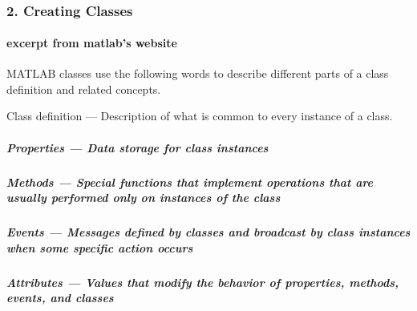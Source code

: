 \documentclass[11pt]{article}
\begin{document}
    \begin{center}
    \end{center}
    { \hspace*{\fill} \\}
    
    \hypertarget{creating-classes}{%
\subsubsection{2. Creating Classes}\label{creating-classes}}

    \hypertarget{excerpt-from-matlabs-website}{%
\paragraph{excerpt from matlab's
website}\label{excerpt-from-matlabs-website}}

MATLAB classes use the following words to describe different parts of a
class definition and related concepts.

Class definition --- Description of what is common to every instance of
a class.

\hypertarget{properties-data-storage-for-class-instances}{%
\subparagraph{Properties --- Data storage for class
instances}\label{properties-data-storage-for-class-instances}}

\hypertarget{methods-special-functions-that-implement-operations-that-are-usually-performed-only-on-instances-of-the-class}{%
\subparagraph{Methods --- Special functions that implement operations
that are usually performed only on instances of the
class}\label{methods-special-functions-that-implement-operations-that-are-usually-performed-only-on-instances-of-the-class}}

    \hypertarget{events-messages-defined-by-classes-and-broadcast-by-class-instances-when-some-specific-action-occurs}{%
\subparagraph{Events --- Messages defined by classes and broadcast by
class instances when some specific action
occurs}\label{events-messages-defined-by-classes-and-broadcast-by-class-instances-when-some-specific-action-occurs}}

\hypertarget{attributes-values-that-modify-the-behavior-of-properties-methods-events-and-classes}{%
\subparagraph{Attributes --- Values that modify the behavior of
properties, methods, events, and
classes}\label{attributes-values-that-modify-the-behavior-of-properties-methods-events-and-classes}}
\end{document}
